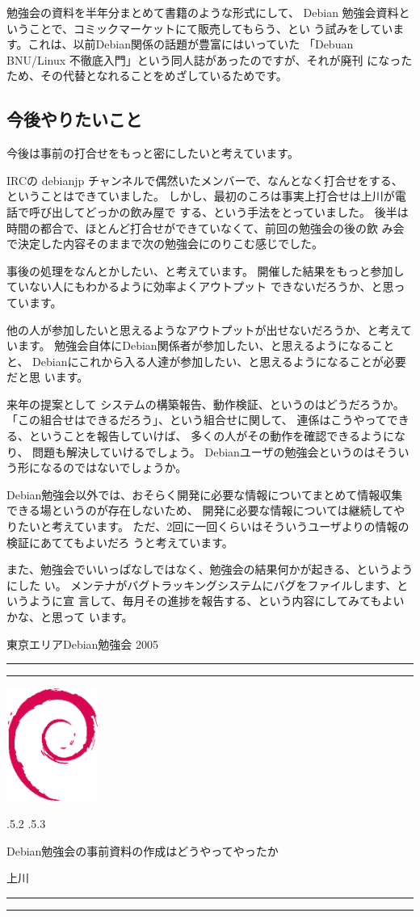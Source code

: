 \documentclass[mingoth,a4paper]{jsarticle}
\makeatletter
\renewcommand{\section}{\@startsection{section}{1}{\z@}%
    {\Cvs \@plus.5\Cdp \@minus.2\Cdp}%
    {.5\Cvs \@plus.3\Cdp}%
    {\normalfont\Large\headfont\raggedright\centering}} %
\newcommand{\dancersection}[2]{%
\newpage
東京エリアDebian勉強会 2005
\hrule
\vspace{0.5mm}
\hrule
\hfill{}\includegraphics[width=3cm]{image200502/openlogo-nd.eps}\\
\vspace{-4cm}
\begin{center}
  \section{#1}
\end{center}
\hfill{}#2\hspace{3cm}\space\\
\hrule
\hrule
\vspace{1cm}
}
\makeatother
\begin{document}
勉強会の資料を半年分まとめて書籍のような形式にして、
Debian 勉強会資料ということで、コミックマーケットにて販売してもらう、とい
う試みをしています。これは、以前Debian関係の話題が豊富にはいっていた
「Debuan BNU/Linux 不徹底入門」という同人誌があったのですが、それが廃刊
になったため、その代替となれることをめざしているためです。

\subsection{今後やりたいこと}

今後は事前の打合せをもっと密にしたいと考えています。

IRCの debianjp チャンネルで偶然いたメンバーで、なんとなく打合せをする、
ということはできていました。
しかし、最初のころは事実上打合せは上川が電話で呼び出してどっかの飲み屋で
する、という手法をとっていました。
後半は時間の都合で、ほとんど打合せができていなくて、前回の勉強会の後の飲
み会で決定した内容そのままで次の勉強会にのりこむ感じでした。

事後の処理をなんとかしたい、と考えています。
開催した結果をもっと参加していない人にもわかるように効率よくアウトプット
できないだろうか、と思っています。

他の人が参加したいと思えるようなアウトプットが出せないだろうか、と考えて
います。
勉強会自体にDebian関係者が参加したい、と思えるようになることと、
Debianにこれから入る人達が参加したい、と思えるようになることが必要だと思
います。

来年の提案として
システムの構築報告、動作検証、というのはどうだろうか。
「この組合せはできるだろう」、という組合せに関して、
連係はこうやってできる、ということを報告していけば、
多くの人がその動作を確認できるようになり、
問題も解決していけるでしょう。
Debianユーザの勉強会というのはそういう形になるのではないでしょうか。

Debian勉強会以外では、おそらく開発に必要な情報についてまとめて情報収集できる場というのが存在しないため、
開発に必要な情報については継続してやりたいと考えています。
ただ、2回に一回くらいはそういうユーザよりの情報の検証にあててもよいだろ
うと考えています。

また、勉強会でいいっぱなしではなく、勉強会の結果何かが起きる、というようにした
い。
メンテナがバグトラッキングシステムにバグをファイルします、というように宣
言して、毎月その進捗を報告する、という内容にしてみてもよいかな、と思って
います。



\dancersection{Debian勉強会の事前資料の作成はどうやってやったか}{上川}
\end{document}
